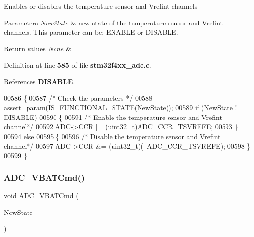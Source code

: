Enables or disables the temperature sensor and Vrefint channels. 


\begin{DoxyParams}{Parameters}
{\em New\+State} & new state of the temperature sensor and Vrefint channels. This parameter can be\+: E\+N\+A\+B\+LE or D\+I\+S\+A\+B\+LE. \\
\hline
\end{DoxyParams}

\begin{DoxyRetVals}{Return values}
{\em None} & \\
\hline
\end{DoxyRetVals}


Definition at line \textbf{ 585} of file \textbf{ stm32f4xx\+\_\+adc.\+c}.



References \textbf{ D\+I\+S\+A\+B\+LE}.


\begin{DoxyCode}
00586 \{
00587   \textcolor{comment}{/* Check the parameters */}
00588   assert_param(IS_FUNCTIONAL_STATE(NewState));
00589   \textcolor{keywordflow}{if} (NewState != DISABLE)
00590   \{
00591     \textcolor{comment}{/* Enable the temperature sensor and Vrefint channel*/}
00592     ADC->CCR |= (uint32\_t)ADC_CCR_TSVREFE;
00593   \}
00594   \textcolor{keywordflow}{else}
00595   \{
00596     \textcolor{comment}{/* Disable the temperature sensor and Vrefint channel*/}
00597     ADC->CCR &= (uint32\_t)(~ADC_CCR_TSVREFE);
00598   \}
00599 \}
\end{DoxyCode}
\mbox{\label{group__ADC__Group3_ga17fc58510ddc80024e65d9738ad6e98c}} 
\subsubsection{A\+D\+C\+\_\+\+V\+B\+A\+T\+Cmd()}
{\footnotesize\ttfamily void A\+D\+C\+\_\+\+V\+B\+A\+T\+Cmd (\begin{DoxyParamCaption}\item[{\textbf{ Functional\+State}}]{New\+State }\end{DoxyParamCaption})}



